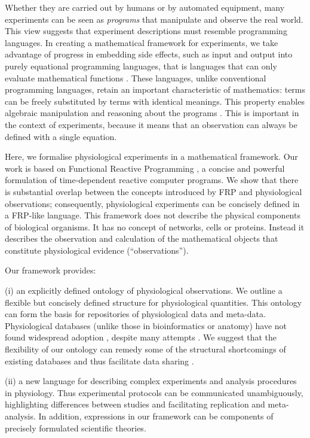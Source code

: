 Whether they are carried out by humans or by automated equipment, many
experiments can be seen as \emph{programs} that manipulate and observe
the real world. This view suggests that experiment descriptions must
resemble programming languages. In creating a mathematical framework
for experiments, we take advantage of progress in embedding side
effects, such as input and output \citep{PeytonJones2002, Roy2004,
  Wadler1995} into purely equational programming languages, that is
languages that can only evaluate mathematical functions
\citep{Church1941}. These languages, unlike conventional programming
languages, retain an important characteristic of mathematics: terms
can be freely substituted by terms with identical meanings. This
property \citep[referential transparency;][]{Whitehead1927} enables
algebraic manipulation and reasoning about the programs
\citep{Bird1996}. This is important in the context of experiments,
because it means that an observation can always be defined with a
single equation.

Here, we formalise physiological experiments in a mathematical
framework. Our work is based on Functional Reactive Programming
\citep[FRP;][]{Elliott1997, Nilsson2002}, a concise and powerful
formulation of time-dependent reactive computer programs. We show that
there is substantial overlap between the concepts introduced by FRP
and physiological observations; consequently, physiological
experiments can be concisely defined in a FRP-like language. This
framework does not describe the physical components of biological
organisms. It has no concept of networks, cells or proteins. Instead
it describes the observation and calculation of the mathematical
objects that constitute physiological evidence (``observations'').

Our framework provides:

(i) an explicitly defined ontology of physiological observations. We
outline a flexible but concisely defined structure for physiological
quantities. This ontology can form the basis for repositories of
physiological data and meta-data. Physiological databases (unlike
those in bioinformatics or anatomy) have not found widespread adoption
\citep{Herz2008, Amari2002}, despite many attempts \citep{Katz2010,
  Teeters2008, Gardner2004, Jessop2010}. We suggest that the
flexibility of our ontology can remedy some of the structural
shortcomings of existing databases \citep{Gardner2005, Amari2002} and
thus facilitate data sharing \citep{Insel2003}.

(ii) a new language for describing complex experiments and analysis
procedures in physiology. Thus experimental protocols can be
communicated unambiguously, highlighting differences between studies
and facilitating replication and meta-analysis. In addition,
expressions in our framework can be components of precisely
formulated scientific theories.

